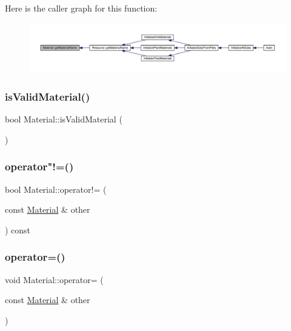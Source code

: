 Here is the caller graph for this function\+:
\nopagebreak
\begin{figure}[H]
\begin{center}
\leavevmode
\includegraphics[width=350pt]{dc/dee/class_material_ac87a8b48812fc2ca84155a1179899635_icgraph}
\end{center}
\end{figure}
\mbox{\label{class_material_a5701802cfadd1ded2f934f15b3f018c9}} 
\subsubsection{\texorpdfstring{is\+Valid\+Material()}{isValidMaterial()}}
{\footnotesize\ttfamily bool Material\+::is\+Valid\+Material (\begin{DoxyParamCaption}{ }\end{DoxyParamCaption})}

\mbox{\label{class_material_a16d6175216c74057b2eab09ccaa7986c}} 
\subsubsection{\texorpdfstring{operator"!=()}{operator!=()}}
{\footnotesize\ttfamily bool Material\+::operator!= (\begin{DoxyParamCaption}\item[{const \mbox{\hyperlink{class_material}{Material}} \&}]{other }\end{DoxyParamCaption}) const}

\mbox{\label{class_material_a0c841562a07082c43d64f7fa9477eb44}} 
\subsubsection{\texorpdfstring{operator=()}{operator=()}}
{\footnotesize\ttfamily void Material\+::operator= (\begin{DoxyParamCaption}\item[{const \mbox{\hyperlink{class_material}{Material}} \&}]{other }\end{DoxyParamCaption})}


